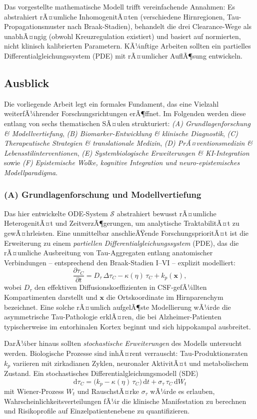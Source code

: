 ﻿\documentclass[12pt,a4paper]{article}
\theoremstyle{definition}
\begin{document}
	Das vorgestellte mathematische Modell trifft vereinfachende Annahmen: Es abstrahiert rÃ¤umliche InhomogenitÃ¤ten (verschiedene Hirnregionen, Tau-Propagationsmuster nach Braak-Stadien), behandelt die drei Clearance-Wege als unabhÃ¤ngig (obwohl Kreuzregulation existiert) und basiert auf normierten, nicht klinisch kalibrierten Parametern. KÃ¼nftige Arbeiten sollten ein partielles Differentialgleichungssystem (PDE) mit rÃ¤umlicher AuflÃ¶sung entwickeln.
	
	\subsection{Ausblick}

	Die vorliegende Arbeit legt ein formales Fundament, das eine Vielzahl weiterfÃ¼hrender Forschungsrichtungen erÃ¶ffnet. Im Folgenden werden diese entlang von sechs thematischen SÃ¤ulen strukturiert: \emph{(A) Grundlagenforschung \& Modellvertiefung}, \emph{(B) Biomarker-Entwicklung \& klinische Diagnostik}, \emph{(C) Therapeutische Strategien \& translationale Medizin}, \emph{(D) PrÃ¤ventionsmedizin \& Lebensstilinterventionen}, \emph{(E) Systembiologische Erweiterungen \& KI-Integration} sowie \emph{(F) Epistemische Wolke, kognitive Integration und neuro-epistemisches Modellparadigma}.

	\subsubsection*{(A) Grundlagenforschung und Modellvertiefung}

	Das hier entwickelte ODE-System $\mathcal{S}$ abstrahiert bewusst rÃ¤umliche HeterogenitÃ¤t und ZeitverzÃ¶gerungen, um analytische TraktabilitÃ¤t zu gewÃ¤hrleisten. Eine unmittelbar anschlieÃŸende ForschungsprioritÃ¤t ist die Erweiterung zu einem \emph{partiellen Differentialgleichungssystem} (PDE), das die rÃ¤umliche Ausbreitung von Tau-Aggregaten entlang anatomischer Verbindungen -- entsprechend den Braak-Stadien I--VI -- explizit modelliert:
	\[
	\frac{\partial \tau_C}{\partial t} = D_\tau \,\Delta \tau_C - \kappa(\eta)\,\tau_C + k_p(\mathbf{x}),
	\]
	wobei $D_\tau$ den effektiven Diffusionskoeffizienten in CSF-gefÃ¼llten Kompartimenten darstellt und $\mathbf{x}$ die Ortskoordinate im Hirnparenchym bezeichnet. Eine solche rÃ¤umlich aufgelÃ¶ste Modellierung wÃ¼rde die asymmetrische Tau-Pathologie erklÃ¤ren, die bei Alzheimer-Patienten typischerweise im entorhinalen Kortex beginnt und sich hippokampal ausbreitet.

	DarÃ¼ber hinaus sollten \emph{stochastische Erweiterungen} des Modells untersucht werden. Biologische Prozesse sind inhÃ¤rent verrauscht: Tau-Produktionsraten $k_p$ variieren mit zirkadianen Zyklen, neuronaler AktivitÃ¤t und metabolischem Zustand. Ein stochastisches Differentialgleichungsmodell (SDE)
	\[
	\mathrm{d}\tau_C = \bigl(k_p - \kappa(\eta)\,\tau_C\bigr)\,\mathrm{d}t + \sigma_\tau\,\tau_C\,\mathrm{d}W_t
	\]
	mit Wiener-Prozess $W_t$ und RauschstÃ¤rke $\sigma_\tau$ wÃ¼rde es erlauben, Wahrscheinlichkeitsverteilungen fÃ¼r die klinische Manifestation zu berechnen und Risikoprofile auf Einzelpatientenebene zu quantifizieren.
\end{document}
